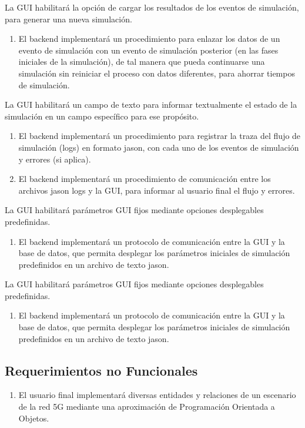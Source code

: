      La GUI habilitará la opción de cargar los resultados de los eventos de simulación, para generar una nueva simulación.
    \begin{enumerate}
        \item  El backend  implementará un procedimiento para enlazar los datos de un evento de simulación con un evento de simulación posterior (en las fases iniciales de la simulación), de tal manera que pueda continuarse   una simulación sin reiniciar el proceso con datos diferentes, para ahorrar tiempos de simulación.
    \end{enumerate}

    La GUI habilitará un campo de texto para informar textualmente el estado de la simulación en un campo específico para ese propósito.
    \begin{enumerate}
        \item  El backend implementará un procedimiento para registrar la traza del flujo de simulación (logs) en formato jason, con cada uno de los eventos de simulación y errores (si aplica).
        \item El backend implementará un procedimiento de comunicación entre los archivos jason logs y la GUI, para informar al usuario final el flujo y errores. %
    \end{enumerate}
    
    La GUI habilitará parámetros GUI fijos mediante opciones desplegables predefinidas.
    \begin{enumerate}
        \item  El backend implementará un protocolo de comunicación entre la GUI y la base de datos, que permita desplegar los parámetros iniciales de simulación predefinidos en un archivo de texto jason.
    \end{enumerate}
    
    La GUI habilitará parámetros GUI fijos mediante opciones desplegables predefinidas.
    \begin{enumerate}
        \item  El backend implementará un protocolo de comunicación entre la GUI y la base de datos, que permita desplegar los parámetros iniciales de simulación predefinidos en un archivo de texto jason.
    \end{enumerate}

\subsection{Requerimientos no Funcionales}
\begin{enumerate}
    \item El usuario final implementará diversas entidades y relaciones de un escenario de la red 5G mediante una aproximación de Programación Orientada a Objetos.
\end{enumerate}
 




